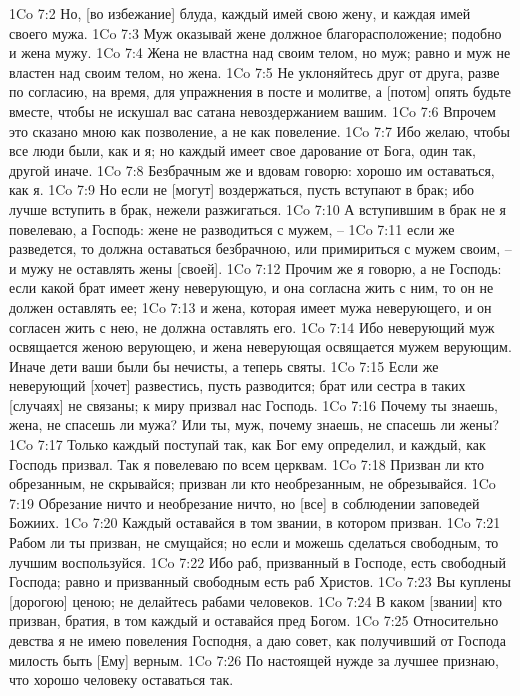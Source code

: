 1Co 7:2  Но, [во избежание] блуда, каждый имей свою жену, и каждая имей своего мужа.
1Co 7:3  Муж оказывай жене должное благорасположение; подобно и жена мужу.
1Co 7:4  Жена не властна над своим телом, но муж; равно и муж не властен над своим телом, но жена.
1Co 7:5  Не уклоняйтесь друг от друга, разве по согласию, на время, для упражнения в посте и молитве, а [потом] опять будьте вместе, чтобы не искушал вас сатана невоздержанием вашим.
1Co 7:6  Впрочем это сказано мною как позволение, а не как повеление.
1Co 7:7  Ибо желаю, чтобы все люди были, как и я; но каждый имеет свое дарование от Бога, один так, другой иначе.
1Co 7:8  Безбрачным же и вдовам говорю: хорошо им оставаться, как я.
1Co 7:9  Но если не [могут] воздержаться, пусть вступают в брак; ибо лучше вступить в брак, нежели разжигаться.
1Co 7:10  А вступившим в брак не я повелеваю, а Господь: жене не разводиться с мужем, --
1Co 7:11  если же разведется, то должна оставаться безбрачною, или примириться с мужем своим, --и мужу не оставлять жены [своей].
1Co 7:12  Прочим же я говорю, а не Господь: если какой брат имеет жену неверующую, и она согласна жить с ним, то он не должен оставлять ее;
1Co 7:13  и жена, которая имеет мужа неверующего, и он согласен жить с нею, не должна оставлять его.
1Co 7:14  Ибо неверующий муж освящается женою верующею, и жена неверующая освящается мужем верующим. Иначе дети ваши были бы нечисты, а теперь святы.
1Co 7:15  Если же неверующий [хочет] развестись, пусть разводится; брат или сестра в таких [случаях] не связаны; к миру призвал нас Господь.
1Co 7:16  Почему ты знаешь, жена, не спасешь ли мужа? Или ты, муж, почему знаешь, не спасешь ли жены?
1Co 7:17  Только каждый поступай так, как Бог ему определил, и каждый, как Господь призвал. Так я повелеваю по всем церквам.
1Co 7:18  Призван ли кто обрезанным, не скрывайся; призван ли кто необрезанным, не обрезывайся.
1Co 7:19  Обрезание ничто и необрезание ничто, но [все] в соблюдении заповедей Божиих.
1Co 7:20  Каждый оставайся в том звании, в котором призван.
1Co 7:21  Рабом ли ты призван, не смущайся; но если и можешь сделаться свободным, то лучшим воспользуйся.
1Co 7:22  Ибо раб, призванный в Господе, есть свободный Господа; равно и призванный свободным есть раб Христов.
1Co 7:23  Вы куплены [дорогою] ценою; не делайтесь рабами человеков.
1Co 7:24  В каком [звании] кто призван, братия, в том каждый и оставайся пред Богом.
1Co 7:25  Относительно девства я не имею повеления Господня, а даю совет, как получивший от Господа милость быть [Ему] верным.
1Co 7:26  По настоящей нужде за лучшее признаю, что хорошо человеку оставаться так.
